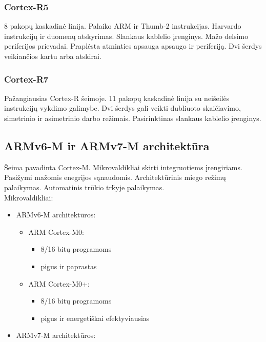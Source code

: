 \documentclass[a4paper, 12pt]{article} %
\begin{document}
\begin{onehalfspacing}
\subsubsection{Cortex-R5}
8 pakop\k{u} kaskadin\.{e} linija. Palaiko ARM ir Thumb-2 instrukcijas. Harvardo instrukcij\k{u} ir duomen\k{u} atskyrimas. Slankaus kablelio \k{i}renginys. Ma\v{z}o delsimo periferijos prievadai. Prapl\.{e}sta atminties apsauga apsaugo ir periferij\k{a}. Dvi \v{s}erdys veikian\v{c}ios kartu arba atskirai.
\subsubsection{Cortex-R7}
Pa\v{z}angiausias Cortex-R \v{s}eimoje. 11 pakop\k{u} kaskadin\.{e} linija su nei\v{s}eil\.{e}s instrukcij\k{u} vykdimo galimybe. Dvi \v{s}erdys gali veikti dubliuoto skai\v{c}iavimo, simetrinio ir asimetrinio darbo re\v{z}imais. Pasirinktinas slankaus kablelio \k{i}renginys.  

\subsection{ARMv6-M ir ARMv7-M architekt\={u}ra}
\v{S}eima pavadinta Cortex-M.
Mikrovaldikliai skirti integruotiems \k{i}rengiriams. Pasi\v{z}ymi ma\v{z}omis enegrijos s\k{a}naudomis. Architekt\={u}rinis miego re\v{z}im\k{u} palaikymas. Automatinis tr\=ukio tr\=kyje palaikymas. \\
Mikrovaldikliai:
\begin{itemize}
\item ARMv6-M architekt\=uros:
\begin{itemize}
\item ARM Cortex-M0:
\begin{itemize}
\item 8/16 bit\k{u} programoms
\item pigus ir paprastas
\end{itemize}
\item ARM Cortex-M0+:
\begin{itemize}
\item 8/16 bit\k{u} programoms
\item pigus ir energeti\v{s}kai efektyviausias
\end{itemize}
\end{itemize}
\end{itemize}
\begin{itemize}
\item ARMv7-M architekt\=uros:
\begin{itemize}


\end{itemize}
\end{itemize}
\end{onehalfspacing}
\end{document}
